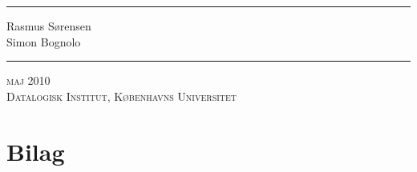 

%

\begin{titlingpage}
\newcommand{\HRule}{\rule{\linewidth}{1mm}}
\noindent\HRule
\begin{flushright}
                \large 
                Rasmus Sørensen\\
                Simon Bognolo
                \\[5mm]
            \huge \Title
\end{flushright}                
\HRule
{}
\begin{center}
\large\textsc{maj 2010}\\
\large\textsc{Datalogisk Institut, Københavns Universitet}
\end{center}
\end{titlingpage}

\frontmatter


\tableofcontents
\newpage

\listoffixmes
\newpage
\lstlistoflistings   
\newpage


%
\mainmatter
\DoubleSpacing
\selectfont 





 


\SingleSpacing
{}
\printbibliography
\newpage
\backmatter

\appendix
\chapter{Bilag}

\restorepagenumber


\newpage



